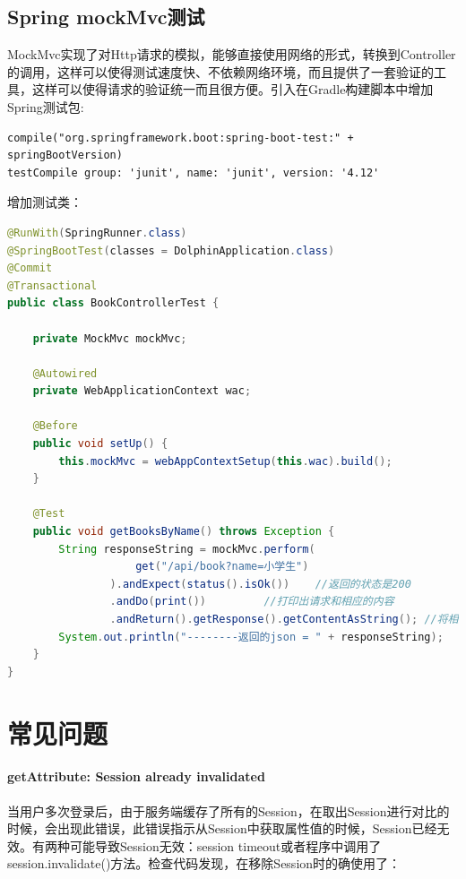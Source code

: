 \documentclass[letter]{book}
\begin{document}
\subsection{Spring mockMvc测试}

MockMvc实现了对Http请求的模拟，能够直接使用网络的形式，转换到Controller的调用，这样可以使得测试速度快、不依赖网络环境，而且提供了一套验证的工具，这样可以使得请求的验证统一而且很方便。引入在Gradle构建脚本中增加Spring测试包:

\begin{lstlisting}
compile("org.springframework.boot:spring-boot-test:" + springBootVersion)
testCompile group: 'junit', name: 'junit', version: '4.12'
\end{lstlisting}

增加测试类：

\begin{lstlisting}[language=Java]
@RunWith(SpringRunner.class)
@SpringBootTest(classes = DolphinApplication.class)
@Commit
@Transactional
public class BookControllerTest {

	private MockMvc mockMvc;
	
	@Autowired
	private WebApplicationContext wac;
	
	@Before
	public void setUp() {
		this.mockMvc = webAppContextSetup(this.wac).build();
	}
	
	@Test
	public void getBooksByName() throws Exception {
		String responseString = mockMvc.perform(
					get("/api/book?name=小学生")
				).andExpect(status().isOk())    //返回的状态是200
				.andDo(print())         //打印出请求和相应的内容
				.andReturn().getResponse().getContentAsString(); //将相应的数据转换为字符串
		System.out.println("--------返回的json = " + responseString);
	}
}
\end{lstlisting}


\section{常见问题}

\paragraph{getAttribute: Session already invalidated}

当用户多次登录后，由于服务端缓存了所有的Session，在取出Session进行对比的时候，会出现此错误，此错误指示从Session中获取属性值的时候，Session已经无效。有两种可能导致Session无效：session timeout或者程序中调用了session.invalidate()方法。检查代码发现，在移除Session时的确使用了：
\end{document}
